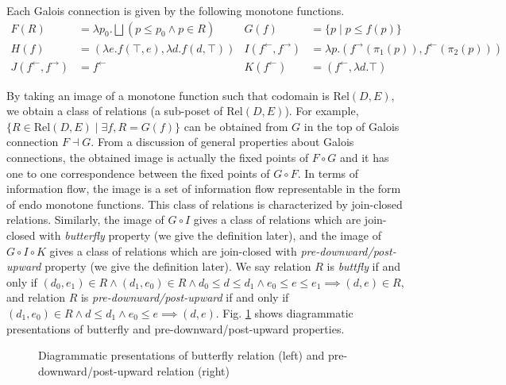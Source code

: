 \documentclass{easychair}
\theoremstyle{definition}
\newcommand{\Rel}{\mathrm{Rel}}
\newcommand{\ff}{{f^{\rightarrow}}}
\newcommand{\fb}{{f^{\leftarrow}}}
\newcommand{\bigjoin}{\bigsqcup}
\newcommand{\comp}{\circ}
\newcommand{\rotleq}{\rotatebox[origin=c]{90}{$\leq$}}
\begin{document}
Each Galois connection is given by the following monotone functions.
\begin{align*}
  F(R) &= \lambda p_{0}. \bigjoin (p \leq p_{0} \land p \in R) &  G(f) &= \{ p \mid p \leq f(p) \} \\
  H(f) &= (\lambda e. f (\top , e) , \lambda d. f (d , \top)) & I(\fb, \ff) &= \lambda p. (\ff (\pi_{1}(p)) , \fb (\pi_{2}(p))) \\
  J(\fb, \ff) &= \fb & K(\fb) &= (\fb , \lambda d. \top)
\end{align*}

By taking an image of a monotone function such that codomain is $\Rel(D, E)$,
we obtain a class of relations (a sub-poset of $\Rel(D, E)$). For
example, $\{ R \in \Rel(D, E) \mid \exists f, R = G(f) \}$ can be obtained from $G$
in the top of Galois connection $F \dashv G$. From a discussion of general
properties about Galois connections, the obtained image is actually the
fixed points of $F \comp G$ and it has one to one correspondence between
the fixed points of $G \comp F$. In terms of information flow, the image
is a set of information flow representable in the form of endo
monotone functions. This class of relations is characterized by join-closed relations.
Similarly, the image of $G \comp I$ gives a class of relations which are join-closed with \emph{butterfly} property (we give the definition later), and the image of $G \comp I \comp K$ gives a class of relations which are join-closed with \emph{pre-downward/post-upward} property (we give the definition later). We say relation $R$ is \emph{buttfly} if and only if $(d_{0}, e_{1}) \in R \land (d_{1}, e_{0}) \in R \land d_{0} \leq d \leq d_{1} \land e_{0} \leq e \leq e_{1} \implies (d , e) \in R$, and relation $R$ is \emph{pre-downward/post-upward} if and only if $(d_{1}, e_{0}) \in R \land d \leq d_{1} \land e_{0} \leq e \implies (d , e)$. Fig. \ref{fig:butterfly} shows diagrammatic presentations of butterfly and pre-downward/post-upward properties.

\begin{figure}[h]
  \centering
  \label{fig:butterfly}
  \caption{Diagrammatic presentations of butterfly relation (left) and pre-downward/post-upward relation (right)}
\end{figure}
\end{document}
